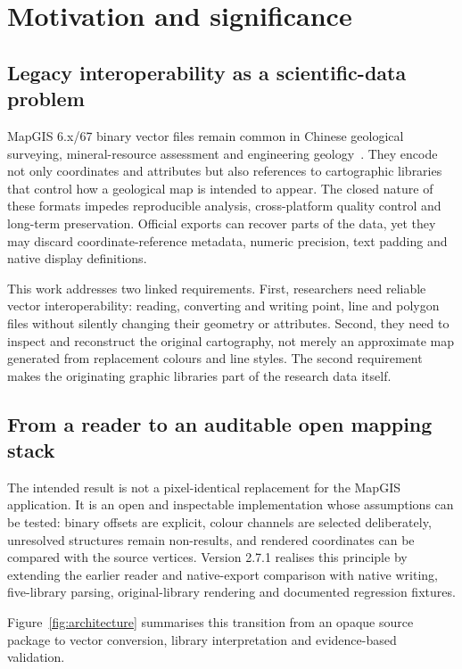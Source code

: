 \documentclass[preprint,12pt,numbers]{elsarticle}
\begin{document}
\section{Motivation and significance}

\subsection{Legacy interoperability as a scientific-data problem}

MapGIS 6.x/67 binary vector files remain common in Chinese geological surveying, mineral-resource assessment and engineering geology~\cite{ma2012,han2012}. They encode not only coordinates and attributes but also references to cartographic libraries that control how a geological map is intended to appear. The closed nature of these formats impedes reproducible analysis, cross-platform quality control and long-term preservation. Official exports can recover parts of the data, yet they may discard coordinate-reference metadata, numeric precision, text padding and native display definitions.

This work addresses two linked requirements. First, researchers need reliable vector interoperability: reading, converting and writing point, line and polygon files without silently changing their geometry or attributes. Second, they need to inspect and reconstruct the original cartography, not merely an approximate map generated from replacement colours and line styles. The second requirement makes the originating graphic libraries part of the research data itself.

\subsection{From a reader to an auditable open mapping stack}

The intended result is not a pixel-identical replacement for the MapGIS application. It is an open and inspectable implementation whose assumptions can be tested: binary offsets are explicit, colour channels are selected deliberately, unresolved structures remain non-results, and rendered coordinates can be compared with the source vertices. Version 2.7.1 realises this principle by extending the earlier reader and native-export comparison with native writing, five-library parsing, original-library rendering and documented regression fixtures.

Figure~\ref{fig:architecture} summarises this transition from an opaque source package to vector conversion, library interpretation and evidence-based validation.
\end{document}
